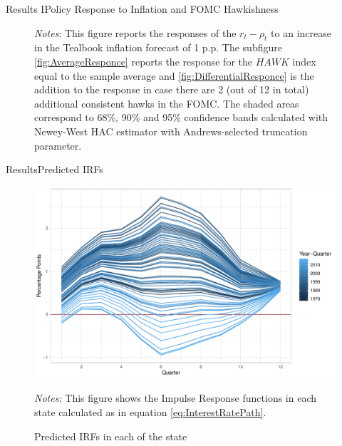 \documentclass[11pt,pdf,aspectratio=129]{beamer}
\begin{document}
\begin{frame}{Results I}{Policy Response to Inflation and FOMC Hawkishness}
\begin{figure}[!htbp]
\begin{subfigure}[b]{0.49\textwidth}
        \end{subfigure}\vspace{-4ex}
            {\begin{flushleft}\tiny\textit{Notes}: This figure reports the responses of the $r_t-\rho_t$ to an increase in the Tealbook inflation forecast of 1 p.p. The subfigure \ref{fig:AverageResponce} reports the response for the $\mathit{HAWK}$ index equal to the sample average and \ref{fig:DifferentialResponce} is the addition to the response in case there are 2 (out of 12 in total) additional consistent hawks in the FOMC. The shaded areas correspond to 68\%, 90\% and 95\% confidence bands calculated with Newey-West HAC estimator with Andrews-selected truncation parameter.\end{flushleft}}
    \end{figure}
    
\end{frame}



\begin{frame}{Results}{Predicted IRFs}
    \begin{figure}[!htbp]\centering
        \begin{minipage}{0.7\textwidth}
          \caption{Predicted IRFs in each of the state} 
          \label{fig:predicted_IRF}
          \includegraphics[width=\linewidth]{irfs_plot.pdf}
          {\begin{flushleft}\tiny \textit{Notes:} This figure shows the Impulse Response functions in each state calculated as in equation \eqref{eq:InterestRatePath}.\end{flushleft}} 
          \end{minipage}
      \end{figure}
\end{frame}
\end{document}
